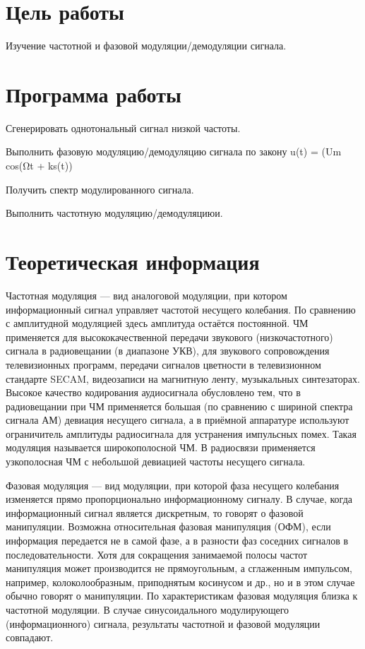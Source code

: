 







\section{Цель работы}
Изучение частотной и фазовой модуляции/демодуляции сигнала.

\section{Программа работы}
Сгенерировать однотональный сигнал низкой частоты.

Выполнить фазовую модуляцию/демодуляцию сигнала по закону u(t) = (Um cos(Ωt + ks(t))

Получить спектр модулированного сигнала.

Выполнить частотную модуляцию/демодуляциюи.\\


\section{Теоретическая информация}
Частотная модуляция — вид аналоговой модуляции, при котором информационный сигнал управляет частотой несущего колебания. По сравнению с амплитудной модуляцией здесь амплитуда остаётся постоянной.
ЧМ применяется для высококачественной передачи звукового (низкочастотного) сигнала в радиовещании (в диапазоне УКВ), для звукового сопровождения телевизионных программ, передачи сигналов цветности в телевизионном стандарте SECAM, видеозаписи на магнитную ленту, музыкальных синтезаторах.
Высокое качество кодирования аудиосигнала обусловлено тем, что в радиовещании при ЧМ применяется большая (по сравнению с шириной спектра сигнала АМ) девиация несущего сигнала, а в приёмной аппаратуре используют ограничитель амплитуды радиосигнала для устранения импульсных помех. Такая модуляция называется широкополосной ЧМ. В радиосвязи применяется узкополосная ЧМ с небольшой девиацией частоты несущего сигнала.

Фазовая модуляция — вид модуляции, при которой фаза несущего колебания изменяется прямо пропорционально информационному сигналу.
В случае, когда информационный сигнал является дискретным, то говорят о фазовой манипуляции. Возможна относительная фазовая манипуляция (ОФМ), если информация передается не в самой фазе, а в разности фаз соседних сигналов в последовательности. Хотя для сокращения занимаемой полосы частот манипуляция может производится не прямоугольным, а сглаженным импульсом, например, колоколообразным, приподнятым косинусом и др., но и в этом случае обычно говорят о манипуляции.
По характеристикам фазовая модуляция близка к частотной модуляции. В случае синусоидального модулирующего (информационного) сигнала, результаты частотной и фазовой модуляции совпадают.




